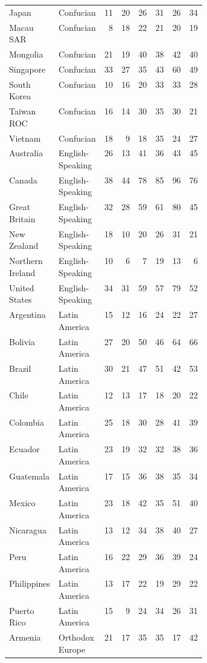 \begin{longtable}{p{0.18\linewidth}p{0.20\linewidth}rrrrrr}
Japan & Confucian & 11 & 20 & 26 & 31 & 26 & 34 \\
Macau SAR & Confucian & 8 & 18 & 22 & 21 & 20 & 19 \\
Mongolia & Confucian & 21 & 19 & 40 & 38 & 42 & 40 \\
Singapore & Confucian & 33 & 27 & 35 & 43 & 60 & 49 \\
South Korea & Confucian & 10 & 16 & 20 & 33 & 33 & 28 \\
Taiwan ROC & Confucian & 16 & 14 & 30 & 35 & 30 & 21 \\
Vietnam & Confucian & 18 & 9 & 18 & 35 & 24 & 27 \\
\addlinespace[2pt]
Australia & English-Speaking & 26 & 13 & 41 & 36 & 43 & 45 \\
Canada & English-Speaking & 38 & 44 & 78 & 85 & 96 & 76 \\
Great Britain & English-Speaking & 32 & 28 & 59 & 61 & 80 & 45 \\
New Zealand & English-Speaking & 18 & 10 & 20 & 26 & 31 & 21 \\
Northern Ireland & English-Speaking & 10 & 6 & 7 & 19 & 13 & 6 \\
United States & English-Speaking & 34 & 31 & 59 & 57 & 79 & 52 \\
\addlinespace[2pt]
Argentina & Latin America & 15 & 12 & 16 & 24 & 22 & 27 \\
Bolivia & Latin America & 27 & 20 & 50 & 46 & 64 & 66 \\
Brazil & Latin America & 30 & 21 & 47 & 51 & 42 & 53 \\
Chile & Latin America & 12 & 13 & 17 & 18 & 20 & 22 \\
Colombia & Latin America & 25 & 18 & 30 & 28 & 41 & 39 \\
Ecuador & Latin America & 23 & 19 & 32 & 32 & 38 & 36 \\
Guatemala & Latin America & 17 & 15 & 36 & 38 & 35 & 34 \\
Mexico & Latin America & 23 & 18 & 42 & 35 & 51 & 40 \\
Nicaragua & Latin America & 13 & 12 & 34 & 38 & 40 & 27 \\
Peru & Latin America & 16 & 22 & 29 & 36 & 39 & 24 \\
Philippines & Latin America & 13 & 17 & 22 & 19 & 29 & 22 \\
Puerto Rico & Latin America & 15 & 9 & 24 & 34 & 26 & 31 \\
\addlinespace[2pt]
Armenia & Orthodox Europe & 21 & 17 & 35 & 35 & 17 & 42 \\

\end{longtable}
